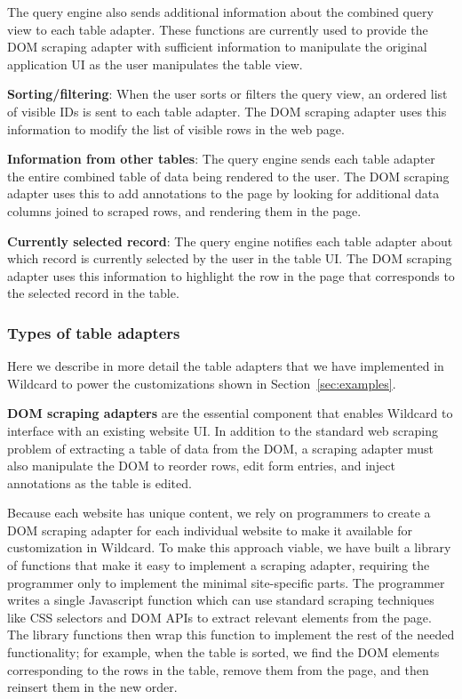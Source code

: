 \documentclass[sigplan,10pt,anonymous,review]{acmart}
\begin{document}
The query engine also sends additional information about the combined
query view to each table adapter. These functions are currently used to
provide the DOM scraping adapter with sufficient information to
manipulate the original application UI as the user manipulates the table
view.

\textbf{Sorting/filtering}: When the user sorts or filters the query
view, an ordered list of visible IDs is sent to each table adapter. The
DOM scraping adapter uses this information to modify the list of visible
rows in the web page.

\textbf{Information from other tables}: The query engine sends each
table adapter the entire combined table of data being rendered to the
user. The DOM scraping adapter uses this to add annotations to the page
by looking for additional data columns joined to scraped rows, and
rendering them in the page.

\textbf{Currently selected record}: The query engine notifies each table
adapter about which record is currently selected by the user in the
table UI. The DOM scraping adapter uses this information to highlight
the row in the page that corresponds to the selected record in the
table.

\hypertarget{types-of-table-adapters}{%
\subsubsection{Types of table adapters}\label{types-of-table-adapters}}

Here we describe in more detail the table adapters that we have
implemented in Wildcard to power the customizations shown in
Section~\ref{sec:examples}.

\textbf{DOM scraping adapters} are the essential component that enables
Wildcard to interface with an existing website UI. In addition to the
standard web scraping problem of extracting a table of data from the
DOM, a scraping adapter must also manipulate the DOM to reorder rows,
edit form entries, and inject annotations as the table is edited.

Because each website has unique content, we rely on programmers to
create a DOM scraping adapter for each individual website to make it
available for customization in Wildcard. To make this approach viable,
we have built a library of functions that make it easy to implement a
scraping adapter, requiring the programmer only to implement the minimal
site-specific parts. The programmer writes a single Javascript function
which can use standard scraping techniques like CSS selectors and DOM
APIs to extract relevant elements from the page. The library functions
then wrap this function to implement the rest of the needed
functionality; for example, when the table is sorted, we find the DOM
elements corresponding to the rows in the table, remove them from the
page, and then reinsert them in the new order.
\end{document}
